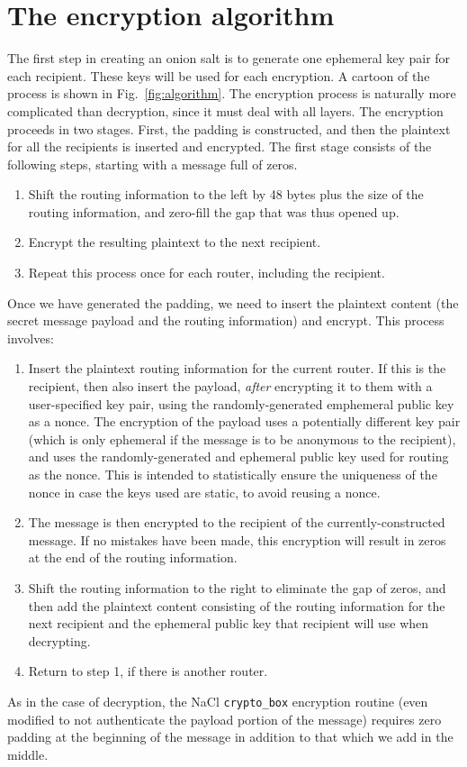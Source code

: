 \documentclass[letterpaper,twocolumn,amsmath,amssymb,pre,aps,10pt]{revtex4-1}
\begin{document}
\section{The encryption algorithm}

The first step in creating an onion salt is to generate one ephemeral
key pair for each recipient.  These keys will be used for each
encryption.  A cartoon of the process is shown in
Fig.~\ref{fig:algorithm}.  The encryption process is naturally more
complicated than decryption, since it must deal with all layers.  The
encryption proceeds in two stages.  First, the padding is constructed,
and then the plaintext for all the recipients is inserted and
encrypted.  The first stage consists of the following steps, starting
with a message full of zeros.
\begin{enumerate}
\item Shift the routing information to the left by 48 bytes plus the
  size of the routing information, and zero-fill the gap that was thus
  opened up.
\item Encrypt the resulting plaintext to the next recipient.
\item Repeat this process once for each router, including the
  recipient.
\end{enumerate}
Once we have generated the padding, we need to insert the plaintext
content (the secret message payload and the routing information) and
encrypt.  This process involves:
\begin{enumerate}
\item Insert the plaintext routing information for the current router.
  If this is the recipient, then also insert the payload, \emph{after}
  encrypting it to them with a user-specified key pair, using the
  randomly-generated emphemeral public key as a nonce.  The encryption
  of the payload uses a potentially different key pair (which is only
  ephemeral if the message is to be anonymous to the recipient), and
  uses the randomly-generated and ephemeral public key used for
  routing as the nonce.  This is intended to statistically ensure the
  uniqueness of the nonce in case the keys used are static, to avoid
  reusing a nonce.
\item The message is then encrypted to the recipient of the
  currently-constructed message.  If no mistakes have been made, this
  encryption will result in zeros at the end of the routing
  information.
\item Shift the routing information to the right to eliminate the gap
  of zeros, and then add the plaintext content consisting of the
  routing information for the next recipient and the ephemeral public
  key that recipient will use when decrypting.
\item Return to step 1, if there is another router.
\end{enumerate}
As in the case of decryption, the NaCl \texttt{crypto\_box} encryption
routine (even modified to not authenticate the payload portion of the
message) requires zero padding at the beginning of the message in
addition to that which we add in the middle.
\end{document}
